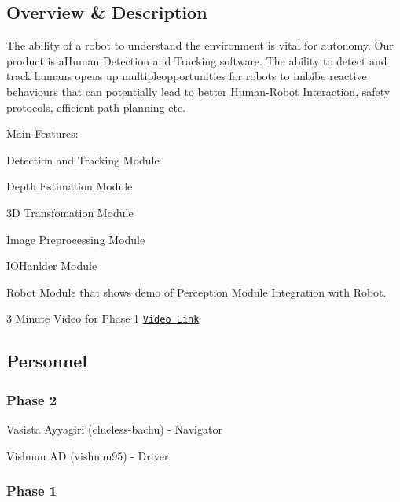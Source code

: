 \href{https://travis-ci.org/clueless-bachu/Human-Detector}{\tt } \subsection*{\href{https://coveralls.io/github/clueless-bachu/Human-Detector?branch=master}{\tt } }

\subsection*{Overview \& Description}

The ability of a robot to understand the environment is vital for autonomy. Our product is a\+Human Detection and Tracking software. The ability to detect and track humans opens up multipleopportunities for robots to imbibe reactive behaviours that can potentially lead to better Human-\/\+Robot Interaction, safety protocols, efficient path planning etc.

Main Features\+:
\begin{DoxyItemize}
\item Detection and Tracking Module
\item Depth Estimation Module
\item 3D Transfomation Module
\item Image Preprocessing Module
\item I\+O\+Hanlder Module
\item Robot Module that shows demo of Perception Module Integration with Robot.
\end{DoxyItemize}

3 Minute Video for Phase 1 \href{https://www.youtube.com/watch?v=N3DkdJLmnMI&feature=youtu.be}{\tt Video Link}

\subsection*{Personnel}

\subsubsection*{Phase 2}


\begin{DoxyItemize}
\item Vasista Ayyagiri (clueless-\/bachu) -\/ Navigator
\item Vishnuu AD (vishnuu95) -\/ Driver
\end{DoxyItemize}

\subsubsection*{Phase 1}


